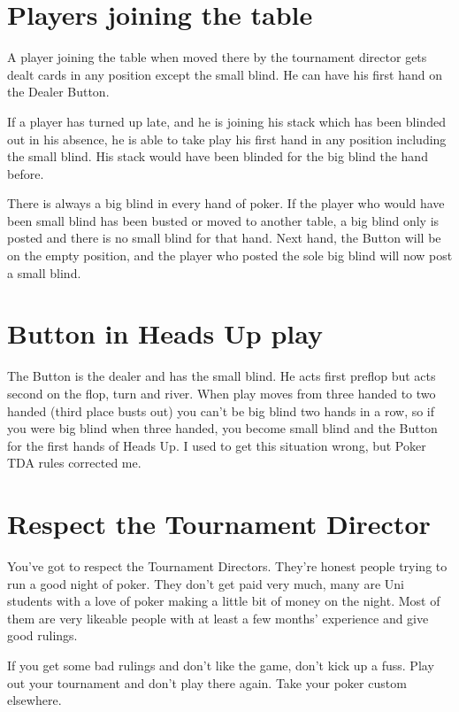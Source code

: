 
\section{Players joining the table}

A player joining the table when moved there by the tournament director
gets dealt cards in any position except the small blind. 
He can have his first hand on the Dealer Button.

If a player has turned up late, and he is joining his stack which has been
blinded out in his absence, he is able to take play his first hand in
any position including the small blind. His stack would have been blinded 
for the big blind the hand before.

There is always a big blind in every hand of poker. If the player who
would have been small blind has been busted or moved to another table,
a big blind only is posted and there is no small blind for that hand.
Next hand, the Button will be on the empty position, and the player
who posted the sole big blind will now post a small blind.

\section{Button in Heads Up play}

The Button is the dealer and has the small blind. He acts first preflop
but acts second on the flop, turn and river. When play moves from
three handed to two handed (third place busts out) you can't be big blind
two hands in a row, so if you were big blind when three handed, you become
small blind and the Button for the first hands of Heads Up. I used to
get this situation wrong, but Poker TDA rules corrected me.

\section{Respect the Tournament Director}

You've got to respect the Tournament Directors. They're honest
people trying to run a good night of poker. They don't get paid very much,
many are Uni students with a love of poker making a little bit of money
on the night. Most of them are very likeable people with at least a 
few months' experience and give good rulings.

If you get some bad rulings and don't like the game, don't kick up a fuss.
Play out your tournament and don't play there again. Take your poker
custom elsewhere.

